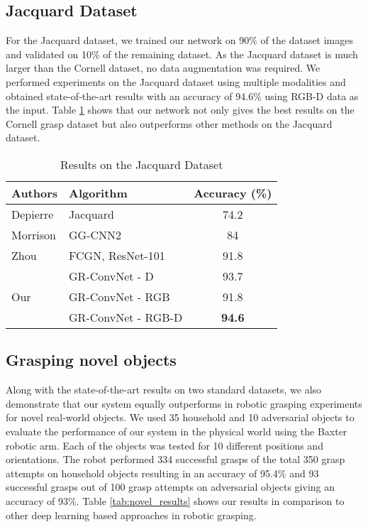 \documentclass[letterpaper, 10 pt, conference]{ieeeconf}
\begin{document}
\subsection{Jacquard Dataset} \label{Jacquard results}
For the Jacquard dataset, we trained our network on 90\% of the dataset images and validated on 10\% of the remaining dataset. As the Jacquard dataset is much larger than the Cornell dataset, no data augmentation was required. We performed experiments on the Jacquard dataset using multiple modalities and obtained state-of-the-art results with an accuracy of 94.6\% using RGB-D data as the input. Table \ref{tab:jacquard_results} shows that our network not only gives the best results on the Cornell grasp dataset but also outperforms other methods on the Jacquard dataset.


\begin{table}
\vspace*{0.1cm}
\begin{center}
\caption{Results on the Jacquard Dataset}
\label{tab:jacquard_results}
\begin{tabular}{llc}
\hline
\textbf{Authors} & \textbf{Algorithm} & \textbf{Accuracy (\%)} \\
\hline
Depierre \cite{depierre2018jacquard} & Jacquard & 74.2 \\
Morrison \cite{morrison2019learning} & GG-CNN2 & 84 \\
Zhou \cite{zhou2018fully} & FCGN, ResNet-101 & 91.8 \\
\hline
 & GR-ConvNet - D & 93.7 \\
Our & GR-ConvNet - RGB & 91.8 \\
 & GR-ConvNet - RGB-D & \textbf{94.6} \\
\hline
\end{tabular}
\end{center}
\end{table}

\subsection{Grasping novel objects}
Along with the state-of-the-art results on two standard datasets, we also demonstrate that our system equally outperforms in robotic grasping experiments for novel real-world objects. We used 35 household and 10 adversarial objects to evaluate the performance of our system in the physical world using the Baxter robotic arm. Each of the objects was tested for 10 different positions and orientations. The robot performed 334 successful grasps of the total 350 grasp attempts on household objects resulting in an accuracy of 95.4\% and 93 successful grasps out of 100 grasp attempts on adversarial objects giving an accuracy of 93\%. Table \ref{tab:novel_results} shows our results in comparison to other deep learning based approaches in robotic grasping. 
\end{document}
